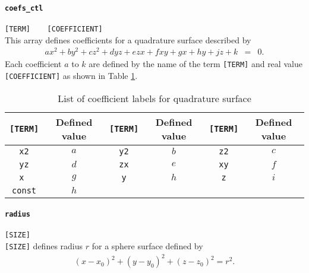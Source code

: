 \paragraph{\tt coefs\_ctl}
\label{href_t:psf_coefs_ctl}
\verb|[TERM]	[COEFFICIENT]| \\
This array defines coefficients for a quadrature surface described by 
\begin{eqnarray*}
a x^2 + b y^2 + c z^2 + d y z + e z x + f x y + g x + h y + j z + k &=& 0.
\end{eqnarray*}
Each coefficient $a$ to $k$ are defined by the name of the term \verb|[TERM]| and real value \verb|[COEFFICIENT]| as shown in Table \ref{table:psf_coefs}.
%
\begin{table}[htp]
\caption{List of coefficient labels for quadrature surface}
\begin{center}
\begin{tabular}{|c|c||c|c||c|c|}
\hline
\verb|[TERM]| & Defined value & \verb|[TERM]| & Defined value & \verb|[TERM]| & Defined value \\ \hline
\verb|x2| & $a$ & \verb|y2| & $b$  & \verb|z2| & $c$ \\
\verb|yz| & $d$ & \verb|zx| & $e$  & \verb|xy| & $f$ \\
\verb|x | & $g$ & \verb|y| & $h$  & \verb|z| & $i$ \\
\verb|const| & $h$ &  &   & &  \\ \hline
\end{tabular}
\end{center}
\label{table:psf_coefs}
\end{table}
%

\paragraph{\tt radius}
\label{href_t:psf_radius}
\verb|[SIZE]| \\
\verb|[SIZE]| defines radius $r$ for a sphere surface defined by 
\begin{eqnarray*}
\left(x-x_{0} \right)^2 + \left(y-y_{0} \right)^2 + \left(z-z_{0} \right)^2 = r^2. 
\end{eqnarray*}

